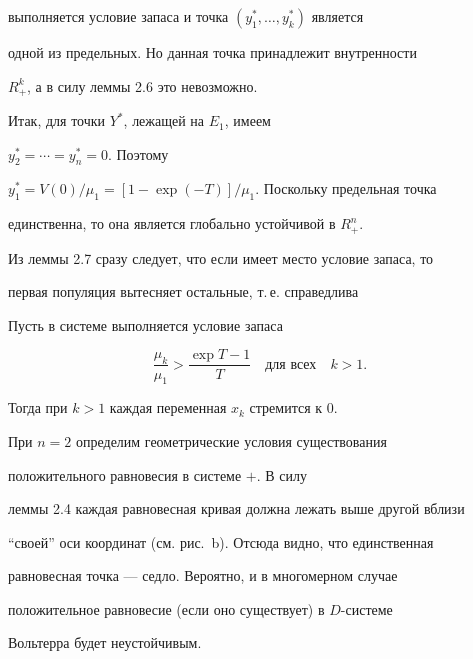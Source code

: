 \begin{pf}
выполняется условие запаса и точка $(y_1^*,\dotsc,y_k^*)$ является 


одной из предельных. Но данная точка принадлежит внутренности 


$R_+^k$, а в силу леммы 2.6 это невозможно.





Итак, для точки $Y^*$, лежащей на $E_1$, имеем 


$y_2^*=\dotsb=y_n^*=0$. Поэтому 


$y_1^*=V(0)/\mu_1=[1-\exp(-T)]/\mu_1$. Поскольку предельная точка 


единственна, то она является глобально устойчивой в $R_+^n$.


\end{pf}





Из леммы 2.7 сразу следует, что если имеет место условие запаса, то 


первая популяция вытесняет остальные, т.\,е. справедлива





\begin{thm}%


Пусть в системе  выполняется условие запаса


$$


\frac{\mu_k}{\mu_1}>\frac{\exp T -1}{T}\quad\text{для всех}\quad 


k>1.


$$


Тогда при $k>1$ каждая переменная $x_k$ стремится к $0$.


\end{thm}





При $n=2$ определим геометрические условия существования 


положительного равновесия в системе $+$. В силу 


леммы 2.4 каждая равновесная кривая должна лежать выше другой вблизи 


``своей'' оси координат (см. рис.~b). Отсюда видно, что единственная 


равновесная точка --- седло. Вероятно, и в многомерном случае 


положительное равновесие (если оно существует) в $D$-системе 


Вольтерра будет неустойчивым.


